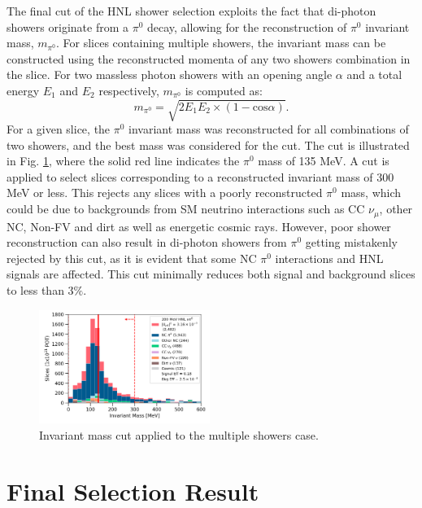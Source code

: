 The final cut of the HNL shower selection exploits the fact that di-photon showers originate from a $\pi^0$ decay, allowing for the reconstruction of $\pi^0$ invariant mass, $m_{\pi^0}$.
For slices containing multiple showers, the invariant mass can be constructed using the reconstructed momenta of any two showers combination in the slice.
For two massless photon showers with an opening angle $\alpha$ and a total energy $E_1$ and $E_2$ respectively, $m_{\pi^0}$ is computed as:
\begin{equation}
	m_{\pi^0} = \sqrt{2 E_1 E_2 \times (1 - \mbox{cos}\alpha)}.
\end{equation}
For a given slice, the $\pi^0$ invariant mass was reconstructed for all combinations of two showers, and the best mass was considered for the cut.
The cut is illustrated in Fig. \ref{fig:mass_cut}, where the solid red line indicates the $\pi^0$ mass of 135 MeV.
A cut is applied to select slices corresponding to a reconstructed invariant mass of 300 MeV or less.
This rejects any slices with a poorly reconstructed $\pi^0$ mass, which could be due to backgrounds from 
SM neutrino interactions such as CC $\nu_\mu$, other NC, Non-FV and dirt as well as energetic cosmic rays.
However, poor shower reconstruction can also result in di-photon showers from $\pi^0$ getting mistakenly rejected by this cut, as it is evident that some NC $\pi^0$ interactions and HNL signals are affected.
This cut minimally reduces both signal and background slices to less than $3 \%$.

\begin{figure}[h!]
        \centering 
        \includegraphics[width=0.495\textwidth]{pizero_mass_precut}
	\caption{
	Invariant mass cut applied to the multiple showers case.
	}
        \label{fig:mass_cut}
\end{figure}

\section{Final Selection Result}
\label{sec:select_result}

